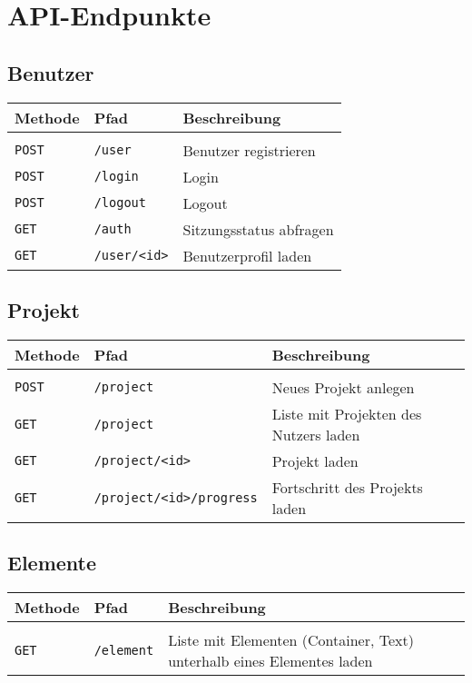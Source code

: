 \section{API-Endpunkte}\label{l:api-endpoints}

\subsection{Benutzer}

\begin{tabular}{@{}l l l}
\textbf{Methode} & \textbf{Pfad} & \textbf{Beschreibung}\\
\hline\\[-1.5ex]
\texttt{POST} & \texttt{/user} & Benutzer registrieren\\
\texttt{POST} & \texttt{/login} & Login\\
\texttt{POST} & \texttt{/logout} & Logout\\
\texttt{GET} & \texttt{/auth} & Sitzungsstatus abfragen\\
\texttt{GET} & \texttt{/user/<id>} & Benutzerprofil laden\\
\end{tabular}

\subsection{Projekt}

\begin{tabular}{@{}l l l}
\textbf{Methode} & \textbf{Pfad} & \textbf{Beschreibung}\\
\hline\\[-1.5ex]
\texttt{POST} & \texttt{/project} & Neues Projekt anlegen\\
\texttt{GET} & \texttt{/project} & Liste mit Projekten des Nutzers laden\\
\texttt{GET} & \texttt{/project/<id>} & Projekt laden\\
\texttt{GET} & \texttt{/project/<id>/progress} & Fortschritt des Projekts laden\\
\end{tabular}

\subsection{Elemente}

\begin{tabular}{@{}l l l}
\textbf{Methode} & \textbf{Pfad} & \textbf{Beschreibung}\\
\hline\\[-1.5ex]
\texttt{GET} & \texttt{/element} & Liste mit Elementen (Container, Text) unterhalb eines Elementes laden\\
\end{tabular}


